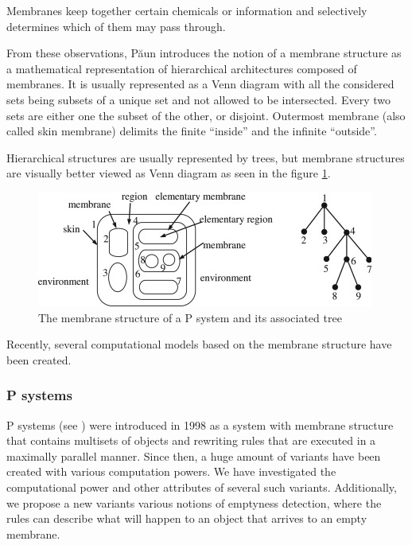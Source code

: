 Membranes keep together certain chemicals or information and selectively determines which of them may pass through.


From these observations, P\u{a}un \cite{Paun98} introduces the notion of a  membrane structure as a mathematical representation of hierarchical architectures composed of membranes. It is usually represented as a Venn diagram with all the considered sets being subsets of a unique set and not allowed to be intersected. Every two sets are either one the subset of the other, or disjoint. Outermost membrane (also called skin membrane) delimits the finite ``inside'' and the infinite ``outside''.

Hierarchical structures are usually represented by trees, but membrane structures are visually better viewed as Venn diagram as seen in the figure \ref{fig:membrane_structure}.

\begin{figure}
  \centering
  \includegraphics{img/membrane_structure.jpg}
  \caption{The membrane structure of a P system and its associated tree \cite{Zhang20101997AnalyzingRadarSignalsWithMembrane}}
  \label{fig:membrane_structure}
\end{figure}


Recently, several computational models based on the membrane structure have been created.




\subsubsection{P systems} %
\label{subs:p_systems}

 P systems (see \cite{Paun98}) were introduced in 1998 as a system with membrane structure that contains multisets of objects and rewriting rules that are executed in a maximally parallel manner. Since then, a huge amount of variants have been created with various computation powers. We have investigated the computational power and other attributes of several such variants. Additionally, we propose a new variants various notions of emptyness detection, where the rules can describe what will happen to an object that arrives to an empty membrane.

